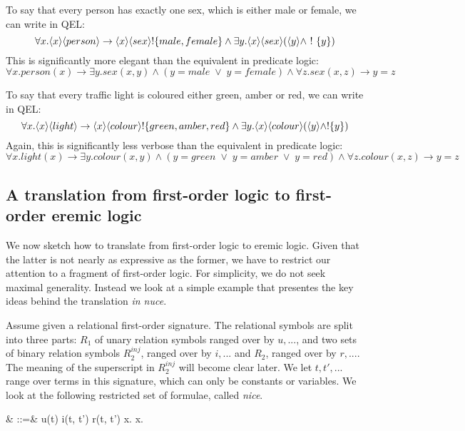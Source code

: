 To say that every person has exactly one sex, which is either male or female, we can write in QEL:
\[
\forall x . \langle x \rangle \langle person \rangle \rightarrow \langle x \rangle \langle sex \rangle ! \{male, female\} \land \exists y . \langle x \rangle \langle sex \rangle (\langle y \rangle \land \ ! \  \{y\})
\]
This is significantly more elegant than the equivalent in predicate logic:
\[
\forall x. person(x) \rightarrow \exists y . sex(x,y) \land (y = male \; \lor \; y = female) \land \forall z . sex(x,z) \rightarrow y = z
\]

To say that every traffic light is coloured either green, amber or red, we can write in QEL:
\[
\forall x. \langle x \rangle \langle light \rangle \rightarrow \langle x \rangle \langle colour \rangle !\{green, amber, red\} \land \exists y . \langle x \rangle \langle colour \rangle (\langle y \rangle \land !\{y\})
\]
Again, this is significantly less verbose than the equivalent in predicate logic:
\[
\forall x. light(x) \rightarrow \exists y . colour(x,y) \land (y = green \; \lor \; y = amber \; \lor \; y = red) \land \forall z . colour(x,z) \rightarrow y = z
\]

\subsection{A translation from first-order logic to first-order eremic logic}

We now sketch how to translate from first-order logic to eremic
logic. Given that the latter is not nearly as expressive as the
former, we have to restrict our attention to a fragment of first-order
logic. For simplicity, we do not seek maximal generality. Instead we
look at a simple example that presentes the key ideas behind the
translation \emph{in nuce}.

Assume given a relational first-order signature. The relational
symbols are split into three parts: $R_1$ of unary relation symbols
ranged over by $u, ...$, and two sets of binary relation symbols
$R_2^{inj}$, ranged over by $i, ...$ and $R_2$, ranged over by $r,
...$. The meaning of the superscript in $R_2^{inj}$ will become clear
later.  We let $t, t', ...$ range over terms in this signature, which
can only be constants or variables. We look at the following
restricted set of formulae, called \emph{nice}.
\begin{GRAMMAR}
  \phi
     & \quad::=\quad &
  u(t) 
     \VERTICAL 
  i(t, t') 
     \VERTICAL 
  r(t, t') 
     \VERTICAL 
  \phi \AND \psi 
     \VERTICAL 
  \forall x.\phi 
     \VERTICAL 
  \exists x.\phi
\end{GRAMMAR}

